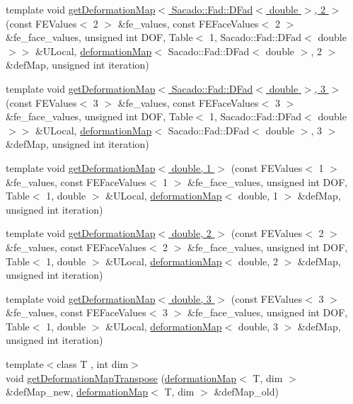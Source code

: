 \begin{DoxyCompactItemize}
\item 
template void \hyperlink{function_evaluations_8cc_ad11d0f7ed38dbb3358eb93a823679880}{get\-Deformation\-Map$<$ Sacado\-::\-Fad\-::\-D\-Fad$<$ double $>$, 2 $>$} (const F\-E\-Values$<$ 2 $>$ \&fe\-\_\-values, const F\-E\-Face\-Values$<$ 2 $>$ \&fe\-\_\-face\-\_\-values, unsigned int D\-O\-F, Table$<$ 1, Sacado\-::\-Fad\-::\-D\-Fad$<$ double $>$$>$ \&U\-Local, \hyperlink{structdeformation_map}{deformation\-Map}$<$ Sacado\-::\-Fad\-::\-D\-Fad$<$ double $>$, 2 $>$ \&def\-Map, unsigned int iteration)
\item 
template void \hyperlink{function_evaluations_8cc_a2b4c316f681796502a2308af3aaf6627}{get\-Deformation\-Map$<$ Sacado\-::\-Fad\-::\-D\-Fad$<$ double $>$, 3 $>$} (const F\-E\-Values$<$ 3 $>$ \&fe\-\_\-values, const F\-E\-Face\-Values$<$ 3 $>$ \&fe\-\_\-face\-\_\-values, unsigned int D\-O\-F, Table$<$ 1, Sacado\-::\-Fad\-::\-D\-Fad$<$ double $>$$>$ \&U\-Local, \hyperlink{structdeformation_map}{deformation\-Map}$<$ Sacado\-::\-Fad\-::\-D\-Fad$<$ double $>$, 3 $>$ \&def\-Map, unsigned int iteration)
\item 
template void \hyperlink{function_evaluations_8cc_a2128b8b5715cb868caf25dc37b818a1d}{get\-Deformation\-Map$<$ double, 1 $>$} (const F\-E\-Values$<$ 1 $>$ \&fe\-\_\-values, const F\-E\-Face\-Values$<$ 1 $>$ \&fe\-\_\-face\-\_\-values, unsigned int D\-O\-F, Table$<$ 1, double $>$ \&U\-Local, \hyperlink{structdeformation_map}{deformation\-Map}$<$ double, 1 $>$ \&def\-Map, unsigned int iteration)
\item 
template void \hyperlink{function_evaluations_8cc_ad204a932cf153014c52e1c59196fab28}{get\-Deformation\-Map$<$ double, 2 $>$} (const F\-E\-Values$<$ 2 $>$ \&fe\-\_\-values, const F\-E\-Face\-Values$<$ 2 $>$ \&fe\-\_\-face\-\_\-values, unsigned int D\-O\-F, Table$<$ 1, double $>$ \&U\-Local, \hyperlink{structdeformation_map}{deformation\-Map}$<$ double, 2 $>$ \&def\-Map, unsigned int iteration)
\item 
template void \hyperlink{function_evaluations_8cc_a7c7b5895783c8ab03bd49b2d099a8d36}{get\-Deformation\-Map$<$ double, 3 $>$} (const F\-E\-Values$<$ 3 $>$ \&fe\-\_\-values, const F\-E\-Face\-Values$<$ 3 $>$ \&fe\-\_\-face\-\_\-values, unsigned int D\-O\-F, Table$<$ 1, double $>$ \&U\-Local, \hyperlink{structdeformation_map}{deformation\-Map}$<$ double, 3 $>$ \&def\-Map, unsigned int iteration)
\item 
{\footnotesize template$<$class T , int dim$>$ }\\void \hyperlink{group___evaluation_functions_gad4003712a2346a79e13bdbfcad4d1e1c}{get\-Deformation\-Map\-Transpose} (\hyperlink{structdeformation_map}{deformation\-Map}$<$ T, dim $>$ \&def\-Map\-\_\-new, \hyperlink{structdeformation_map}{deformation\-Map}$<$ T, dim $>$ \&def\-Map\-\_\-old)

\end{DoxyCompactItemize}
